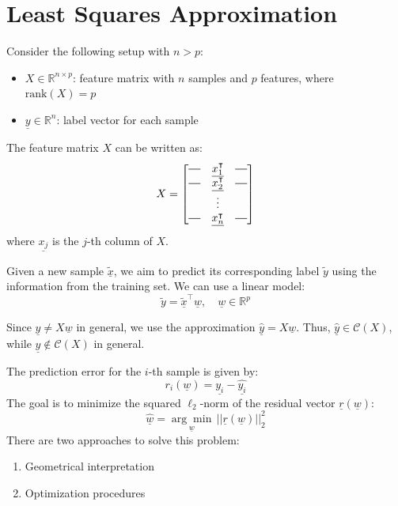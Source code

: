 \section{Least Squares Approximation}
Consider the following setup with $n > p$:
\begin{itemize}
    \item $X \in \mathbb{R}^{n \times p}$: feature matrix with $n$ samples and $p$ features, where $\text{rank}(X) = p$
    \item $\underline{y} \in \mathbb{R}^n$: label vector for each sample
\end{itemize}
The feature matrix $X$ can be written as:
\[
X = 
\begin{bmatrix}
    \horzbar & \underline{x_1^\intercal} & \horzbar\\
    \horzbar & \underline{x_2^\intercal} & \horzbar\\    
     & \vdots & \\
    \horzbar & \underline{x_n^\intercal} & \horzbar
\end{bmatrix}
\]
where $\underline{x_j}$ is the $j$-th column of $X$.

Given a new sample $\tilde{\underline{x}}$, we aim to predict its corresponding label $\tilde{y}$ using the information from the training set. We can use a linear model:
\[
    \tilde{y} = \tilde{\underline{x}}^\intercal \underline{w}, \quad \underline{w} \in \mathbb{R}^p
\]

Since $\underline{y} \neq X\underline{w}$ in general, we use the approximation $\hat{\underline{y}} = X\underline{w}$. Thus, $\hat{\underline{y}} \in \mathcal{C}(X)$, while $\underline{y} \notin \mathcal{C}(X)$ in general.

The prediction error for the $i$-th sample is given by:
\[
    r_i(\underline{w}) = \underline{y_i} - \underline{\hat{y_i}}    
\]
The goal is to minimize the squared $\ell_2$-norm of the residual vector $\underline{r}(\underline{w})$:
\[
    \hat{\underline{w}} = \underset{\underline{w}}{\arg\min}\,||\underline{r}(\underline{w})||^2_2
\]
There are two approaches to solve this problem:
\begin{enumerate}
    \item Geometrical interpretation
    \item Optimization procedures
\end{enumerate}

